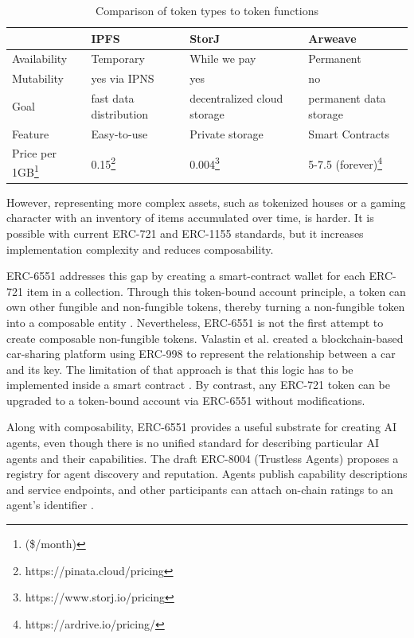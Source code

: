 \begin{table}[ht]
  \centering
  \caption{Comparison of token types to token functions}
  \begin{tabular}{ |p{2cm}|p{3.5cm}|p{3.5cm}|p{3.5cm}| }
  \hline
          & IPFS & StorJ & Arweave                                 \\
  \hline
  Availability  & Temporary & While we pay & Permanent     \\
  \hline
  Mutability  &  yes via IPNS & yes & no     \\
  \hline
  Goal &  fast data distribution & decentralized cloud storage & permanent data storage     \\
  \hline
  Feature & Easy-to-use    & Private storage   & Smart Contracts     \\
  \hline
  Price per 1GB\footnote{(\$/month)} & 0.15\footnote{https://pinata.cloud/pricing}    & 0.004\footnote{https://www.storj.io/pricing}  & 5-7.5 (forever)\footnote{https://ardrive.io/pricing/}     \\
  \hline
  \end{tabular}
  \label{table:storages}
  \end{table}


However, representing more complex assets, such as tokenized houses or a gaming character with an inventory of items accumulated over time, is harder. It is possible with current ERC-721 and ERC-1155 standards, but it increases implementation complexity and reduces composability.

ERC-6551 addresses this gap by creating a smart-contract wallet for each ERC-721 item in a collection. Through this token-bound account principle, a token can own other fungible and non-fungible tokens, thereby turning a non-fungible token into a composable entity \cite{EIP6551}. Nevertheless, ERC-6551 is not the first attempt to create composable non-fungible tokens. Valastin et al. created a blockchain-based car-sharing platform using ERC-998 to represent the relationship between a car and its key. The limitation of that approach is that this logic has to be implemented inside a smart contract \cite{valastin2019, EIP998}. By contrast, any ERC-721 token can be upgraded to a token-bound account via ERC-6551 without modifications.

Along with composability, ERC-6551 provides a useful substrate for creating AI agents, even though there is no unified standard for describing particular AI agents and their capabilities. The draft ERC-8004 (Trustless Agents) proposes a registry for agent discovery and reputation. Agents publish capability descriptions and service endpoints, and other participants can attach on-chain ratings to an agent's identifier \cite{EIP8004}.

